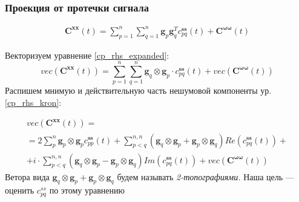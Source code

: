 \documentclass[12pt]{beamer}
\newcommand{\Cp}[1]{\mathbf{C}^{\mathbf{#1 #1}}} %
\begin{document}
\begin{frame}[t]
    \frametitle{Проекция от протечки сигнала}
    
\begin{gather}
    \scriptstyle
    \Cp{x}(t) = \sum\limits_{p=1}^n\sum\limits_{q=1}^n\mathbf{g}_p\mathbf{g}_q^T c_{pq}^{\mathbf{ss}}(t) + \Cp{\omega}(t)
    \label{cp_rhs_expanded}
\end{gather}

{\tiny Векторизуем уравнение \ref{cp_rhs_expanded}:}
\begin{equation}
    \scriptstyle
    vec(\Cp{x}(t)) = \sum\limits_{p=1}^n\sum\limits_{q=1}^n
    \mathbf{g}_q\otimes \mathbf{g}_p \cdot c_{pq}^{\mathbf{ss}}(t) + vec(\Cp{\omega}(t))
    \label{cp_rhs_kron}
\end{equation}
{\tiny Распишем мнимую и действительную часть нешумовой компоненты ур. \ref{cp_rhs_kron}:}

\begin{gather*}
    \scriptstyle
    vec(\Cp{x}(t)) = \\
    \scriptstyle
           =2\sum\limits_{p}^{n} \mathbf{g}_p\otimes \mathbf{g}_p c_{pp}^{\mathbf{ss}}(t) +
           \sum\limits_{p< q}^{n,n} (\mathbf{g}_q\otimes \mathbf{g}_p + \mathbf{g}_p\otimes \mathbf{g}_q)
           Re\left(c_{pq}^{\mathbf{ss}}(t)\right) + \\
    \scriptstyle
     + i \cdot \sum\limits_{p<q}^{n,n} (\mathbf{g}_q\otimes \mathbf{g}_p - \mathbf{g}_p\otimes \mathbf{g}_q)
           Im\left(c_{pq}^{\mathbf{ss}}(t)\right) + vec(\Cp{\omega}(t))
    \label{eq:cp_re_im}
\end{gather*}
{\tiny Ветора вида $\mathbf{g}_q\otimes \mathbf{g}_p + \mathbf{g}_p\otimes \mathbf{g}_q$ будем называть \emph{2-топографиями.} Наша цель --- оценить $c_{pq}^{ss}$ по этому уравнению}

\end{frame}
\end{document}
